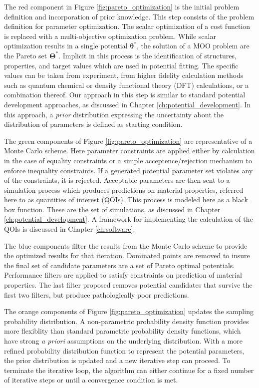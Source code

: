 The red component in Figure \ref{fig:pareto_optimization} is the initial problem definition and incorporation of prior knowledge.  This step consists of the problem definition for parameter optimization.  The scalar optimization of a cost function is replaced with a multi-objective optimization problem.  While scalar optimization results in a single potential $\bm{\theta}^*$, the solution of a MOO problem are the Pareto set $\bm{\Theta}^*$.  Implicit in this process is the identification of structures, properties, and target values which are used in potential fitting. The specific values can be taken from experiment, from higher fidelity calculation methods such as quantum chemical or density functional theory (DFT) calculations, or a combination thereof. Our approach in this step is similar to standard potential development approaches, as discussed in Chapter \ref{ch:potential_development}.  In this approach, a \emph{prior} distribution expressing the uncertainty about the distribution of parameters is defined as starting condition.

The green components of Figure \ref{fig:pareto_optimization} are representative of a Monte Carlo scheme.  Here parameter constraints are applied either by calculation in the case of equality constraints or a simple acceptence/rejection mechanism to enforce inequality constraints.  If a generated potential parameter set violates any of the constraints, it is rejected.  Acceptable parameters are then sent to a simulation process which produces predictions on material properties, referred here to as quantities of interest (QOIs).  This process is modeled here as a black box function. These are the set of simulations, as discussed in Chapter \ref{ch:potential_development}.  A framework for implementing the calculation of the QOIs is discussed in Chapter \ref{ch:software}.

The blue components filter the results from the Monte Carlo scheme to provide the optimized results for that iteration.  Dominated points are removed to insure the final set of candidate parameters are a set of Pareto optimal potentials.  Performance filters are applied to satisfy constraints on prediction of material properties.  The last filter proposed removes potential candidates that survive the first two filters, but produce pathologically poor predictions.

The orange components of Figure \ref{fig:pareto_optimization} updates the sampling probability distribution.  A non-parametric probability density function provides more flexiblity than standard parametric probability density functions, which have strong \emph{a priori} assumptions on the underlying distribution.  With a more refined probability distribution function to represent the potential parameters, the prior distribution is updated and a new iterative step can proceed.  To terminate the iterative loop, the algorithm can either continue for a fixed number of iterative steps or until a convergence condition is met.

